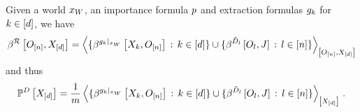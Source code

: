 \begin{theorem}
    \label{the:extractionrelationDecomposition}
    Given a \firstOrderLogic{} world $x_{W}$, an importance formula $p$ and extraction formulas $g_{k}$ for $k\in[d]$, we have
    \begin{align*}
        \bencodingofat{\extractionrelation}{\shortindvariables,\shortcatvariables} =
        \contractionof{
            \{\bencodingofat{\groundingof{\extformulaof{\atomenumerator}}}{\catvariableof{\catenumerator},\shortindvariables} \wcols \catenumeratorin\}
            \cup \{\bencodingofat{\secdatamap_{\indenumerator}}{\indvariableof{\indenumerator},\datvariable} \wcols \indenumeratorin\}
        }{\shortindvariables,\shortcatvariables}
    \end{align*}
    and thus
    \begin{align*}
        \empdistributionat{\shortcatvariables} =
        \frac{1}{\datanum}  \contractionof{
            \{\bencodingofat{\groundingof{\extformulaof{\atomenumerator}}}{\catvariableof{\catenumerator},\shortindvariables} \wcols \catenumeratorin\}
            \cup \{\bencodingofat{\secdatamap_{\indenumerator}}{\indvariableof{\indenumerator},\datvariable} \wcols \indenumeratorin\}
        }{\shortcatvariables} \, .
    \end{align*}
\end{theorem}
